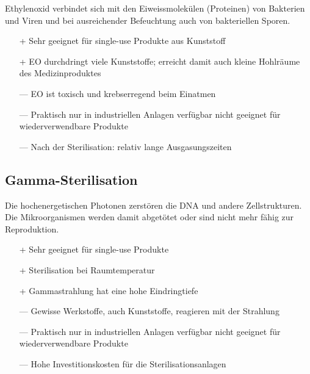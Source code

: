 Ethylenoxid verbindet sich mit den Eiweissmolekülen (Proteinen) von Bakterien und Viren und bei ausreichender Befeuchtung auch von bakteriellen Sporen.

\begin{itemize}
	\item[+] Sehr geeignet für single-use Produkte aus Kunststoff
	\item[+] EO durchdringt viele Kunststoffe; erreicht damit auch kleine Hohlräume des Medizinproduktes
	\item[---] EO ist toxisch und krebserregend beim Einatmen
	\item[---] Praktisch nur in industriellen Anlagen verfügbar nicht geeignet für wiederverwendbare Produkte
	\item[---] Nach der Sterilisation: relativ lange Ausgasungszeiten
\end{itemize}

\subsection{Gamma-Sterilisation}

Die hochenergetischen Photonen zerstören die DNA und andere Zellstrukturen. Die Mikroorganismen werden damit abgetötet oder sind nicht mehr fähig zur Reproduktion.

\begin{itemize}
	\item[+] Sehr geeignet für single-use Produkte
	\item[+] Sterilisation bei Raumtemperatur
	\item[+] Gammastrahlung hat eine hohe Eindringtiefe
	\item[---] Gewisse Werkstoffe, auch Kunststoffe, reagieren mit der Strahlung
	\item[---] Praktisch nur in industriellen Anlagen verfügbar nicht geeignet für wiederverwendbare Produkte
	\item[---] Hohe Investitionskosten für die Sterilisationsanlagen
\end{itemize}